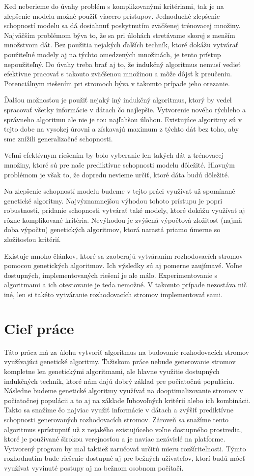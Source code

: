 Keď neberieme do úvahy problém s komplikovanými kritériami, tak je na zlepšenie modelu možné použiť viacero prístupov. Jednoduché zlepšenie schopností modelu sa dá dosiahnuť poskytnutím zväčšenej trénovacej množiny. Najväčším problémom býva to, že sa pri úlohách stretávame skorej s menším množstvom dát. Bez použitia nejakých ďalších techník, ktoré dokážu vytvárať použiteľné modely aj na týchto omedzených množinách, je tento prístup nepoužiteľný. Do úvahy treba brať aj to, že indukčný algoritmus nemusí vedieť efektívne pracovať s takouto zväčšenou množinou a môže dôjsť k preučeniu. Potenciálnym riešením pri stromoch býva v takomto prípade jeho orezanie.

Ďalšou možnosťou je použiť nejaký iný indukčný algoritmus, ktorý by vedel spracovať všetky informácie v dátach čo najlepšie. Vytvorenie nového rýchleho a správneho algoritmu ale nie je tou najľahšou úlohou. Existujúce algoritmy sú v tejto dobe na vysokej úrovni a získavajú maximum z týchto dát bez toho, aby sme znížili generalizačné schopnosti.

Veľmi efektívnym riešením by bolo vyberanie len takých dát z trénovacej množiny, ktoré sú pre naše prediktívne schopnosti modelu dôležité. Hlavným problémom je však to, že dopredu nevieme určiť, ktoré dáta budú dôležité.

Na zlepšenie schopností modelu budeme v tejto práci využívať už spomínané genetické algoritmy. Najvýznamnejšou výhodou tohoto prístupu je popri robustnosti, pridanie schopnosti vytvárať také modely, ktoré dokážu využívať aj rôzne komp\-likované kritéria. Nevýhodou je zvýšená výpočtová zložitosť (najmä doba výpočtu) genetických algoritmov, ktorá narastá priamo úmerne so zložitosťou kritérií.

Existuje mnoho článkov, ktoré sa zaoberajú vytváraním rozhodovacích stromov pomocou genetických algoritmov. Ich výsledky sú aj pomerne zaujímavé. Voľne dostupných, implementovaných riešení je ale málo. Experimentovanie s algoritmami a ich otestovanie je teda nemožné. V takomto prípade nezostáva nič iné, len si takéto vytváranie rozhodovacích stromov implementovať sami.
\section{Cieľ práce}
Táto práca má za úlohu vytvoriť algoritmus na budovanie rozhodovacích stromov využívajúci genetické algoritmy. Ťažiskom práce nebude generovanie stromov kompletne len genetickými algoritmami, ale hlavne využitie dostupných indukčných techník, ktoré nám dajú dobrý základ pre počiatočnú populáciu. Následne budeme genetické algoritmy využívať na dooptimalizovanie stromov v počiatočnej populácii a to aj na základe ľubovoľných kritérií alebo ich kombinácii. Takto sa snažíme čo najviac využiť informácie v dátach a zvýšiť prediktívne schopnosti generovaných rozhodovacích stromov. Zároveň sa snažíme tento algoritmus sprístupniť už z nejakého existujúceho voľne dostupného prostredia, ktoré je používané širokou verejnosťou a je naviac nezávislé na platforme. Vytvorený program by mal taktiež zaručovať určitú mieru rozšíriteľnosti. Týmto rozhodnutím bude riešenie dostupné aj pre bežných užívateľov, ktorí budú môcť využívat vyvinuté postupy aj na bežnom osobnom počítači. 

